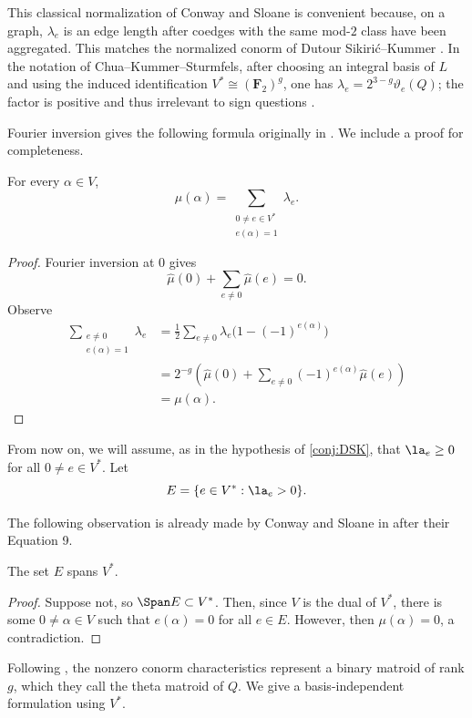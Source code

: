 \documentclass[11pt,letterpaper]{amsart}
\begin{document}
This classical normalization of Conway and Sloane \cite{CS} is convenient because, on a graph, $\lambda_e$ is an edge length after coedges with the same mod-$2$ class have been aggregated.  This matches the normalized conorm of Dutour Sikiri\'c--Kummer \cite{sikiric2022iso}. In the notation of Chua--Kummer--Sturmfels, after choosing an integral basis of $L$ and using the induced identification $V^*\cong(\mathbf F_2)^g$, one has $\lambda_e=2^{3-g}\vartheta_e(Q)$; the factor is positive and thus irrelevant to sign questions \cite{chua2019schottky}. 

Fourier inversion gives the following formula originally in \cite{CS}. We include a proof for completeness. 

\begin{proposition}\cite[Equation (9)]{CS}\label{prop:fourier-inversion}
For every $\alpha\in V$,
\[
  \mu(\alpha)=
  \sum_{\substack{0\ne e\in V^*\\e(\alpha)=1}}\lambda_e.
\]
\end{proposition}
\begin{proof}
    Fourier inversion at $0$ gives
\[
  \widehat\mu(0)+\sum_{e\ne0}\widehat\mu(e)=0.
\]
Observe
\begin{align*}
    \sum_{\substack{e\ne0\\e(\alpha)=1}}\lambda_e
  &=\frac12\sum_{e\ne0}\lambda_e\bigl(1-(-1)^{e(\alpha)}\bigr)\\
  &=2^{-g}\left(
  \widehat\mu(0)+
  \sum_{e\ne0}(-1)^{e(\alpha)}\widehat\mu(e)
  \right)\\
  &=\mu(\alpha).
\end{align*}
\end{proof}

From now on, we will assume, as in the hypothesis of \cref{conj:DSK}, that $\la_e \geq 0$ for all $0 \neq e \in V^*$. Let $$E = \{e \in V^*: \la_e > 0\}.$$

The following observation is already made by Conway and Sloane in \cite{CS} after their Equation 9.
\begin{lemma}[\cite{CS}]\label{lem:E-spans}
The set $E$ spans $V^*$.
\end{lemma}
\begin{proof}
    Suppose not, so $\Span E \subset V^*$. Then, since $V$ is the dual of $V^*$, there is some $0 \neq \alpha \in V$ such that $e(\alpha) = 0$ for all $e \in E$. However, then $\mu(\alpha) = 0$, a contradiction.
\end{proof}

Following \cite{chua2019schottky}, the nonzero conorm characteristics represent a binary matroid of rank $g$, which they call the theta matroid of $Q$. We give a basis-independent formulation using $V^*$.
\end{document}
